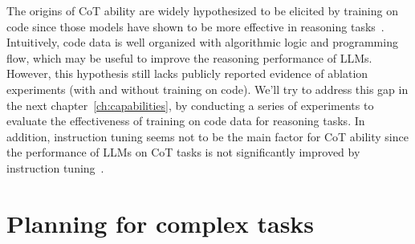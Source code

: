 The origins of CoT ability are widely hypothesized to be elicited by training on code since those models have shown to be more effective in reasoning tasks~\cite{fu2022gptroadmap, liang2022holistic}.
Intuitively, code data is well organized with algorithmic logic and programming flow, which may be useful to improve the reasoning performance of LLMs. However, this hypothesis still lacks publicly reported evidence of ablation experiments (with and without training on code).
We'll try to address this gap in the next chapter~\ref{ch:capabilities}, by conducting a series of experiments to evaluate the effectiveness of training on code data for reasoning tasks.
In addition, instruction tuning seems not to be the main factor for CoT ability since the performance of LLMs on CoT tasks is not significantly improved by instruction tuning~\cite{chung2022scaling}.

\section{Planning for complex tasks}
\label{sec:planning}

